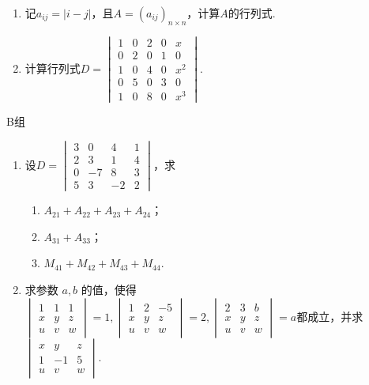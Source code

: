 \begin{enumerate}
    \item 记$a_{ij}=|i-j|$，且$A=(a_{ij})_{n\times n}$，计算$A$的行列式.

    \item 计算行列式$D=\begin{vmatrix}
        1 & 0 & 2 & 0 & x \\
        0 & 2 & 0 & 1 & 0 \\
        1 & 0 & 4 & 0 & x^2 \\
        0 & 5 & 0 & 3 & 0 \\
        1 & 0 & 8 & 0 & x^3
    \end{vmatrix}$.

\end{enumerate}

\centerline{\heiti B组}
\begin{enumerate}
    \item 设$D=\begin{vmatrix}
                  3 & 0 & 4 & 1 \\ 2 & 3 & 1 & 4 \\ 0 & -7 & 8 & 3 \\ 5 & 3 & -2 & 2
              \end{vmatrix}$，求
          \begin{enumerate}
              \item $A_{21}+A_{22}+A_{23}+A_{24}$；

              \item $A_{31}+A_{33}$；

              \item $M_{41}+M_{42}+M_{43}+M_{44}$.
          \end{enumerate}

    \item 求参数 $a,b$  的值，使得$\begin{vmatrix}1 & 1 & 1 \\ x & y & z \\u & v & w\end{vmatrix}=1,
              \begin{vmatrix}1 & 2 & -5 \\ x & y & z \\u & v & w\end{vmatrix}=2,
              \begin{vmatrix}2 & 3 & b \\ x & y & z \\u & v & w\end{vmatrix}=a$都成立，并求$\begin{vmatrix}x & y & z \\ 1 & -1 & 5 \\u & v & w\end{vmatrix}$.


\end{enumerate}
